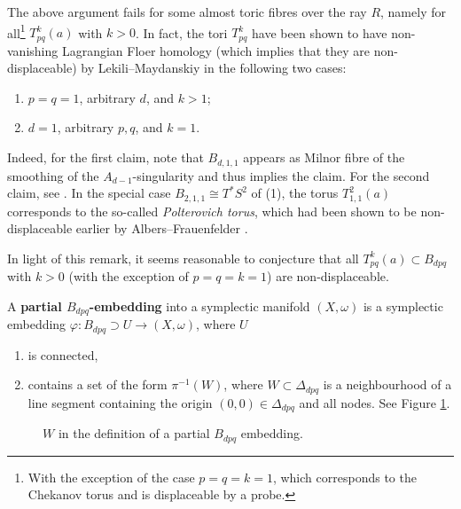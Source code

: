 \documentclass[12pt,a4paper,draft]{scrartcl}
\begin{document}
\begin{remark}
    The above argument fails for some almost toric fibres over the ray $R$, namely for all\footnote{With the exception of the case $p=q=k=1$, which corresponds to the Chekanov torus and is displaceable by a probe.} $T^k_{pq}(a)$ with $k > 0$. In fact, the tori $T^k_{pq}$ have been shown to have non-vanishing Lagrangian Floer homology (which implies that they are non-displaceable) by Lekili--Maydanskiy \cite{LekMay14} in the following two cases:
    \begin{enumerate}
        \item $p = q = 1$, arbitrary $d$, and $k > 1$;
        \item $d = 1$, arbitrary $p,q$, and $k = 1$.
    \end{enumerate}
    Indeed, for the first claim, note that $B_{d,1,1}$ appears as Milnor fibre of the smoothing of the $A_{d-1}$-singularity and thus \cite[Proposition 2.20]{LekMay14} implies the claim.
For the second claim, see \cite[Proposition 3.6]{LekMay14}. In the special case $B_{2,1,1} \cong T^*S^2$ of (1), the torus $T_{1,1}^2(a)$ corresponds to the so-called \emph{Polterovich torus}, which had been shown to be non-displaceable earlier by Albers--Frauenfelder \cite{AlbFra08}.
\end{remark}

In light of this remark, it seems reasonable to conjecture that all $T^k_{pq}(a) \subset B_{dpq}$ with $k > 0$ (with the exception of $p=q=k=1$) are non-displaceable.

\begin{definition}
    \label{def:partial_embedding}
    A \textbf{partial $B_{dpq}$-embedding} into a symplectic manifold $(X,\omega)$ is a symplectic embedding $φ:B_{dpq} ⊃ U → (X,ω)$, where $U$ 
    \begin{enumerate}
        \item is connected, 
        \item contains a set of the form $\pi^{-1}(W)$, where $W \subset \Delta_{dpq}$ is a neighbourhood of a line segment containing the origin $(0,0) \in \Delta_{dpq}$ and all nodes.
 See Figure \cref{fig:partial-Bdpq-embedding}.   
    \end{enumerate}
\end{definition}

\begin{figure}
    \centering
    \caption{$W$ in the definition of a partial $B_{dpq}$ embedding.}
    \label{fig:partial-Bdpq-embedding}
\end{figure}
\end{document}
